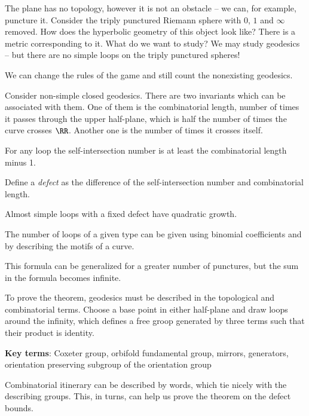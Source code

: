\documentclass[11pt]{scrartcl}
\begin{document}
The plane has no topology, however it is not an obstacle -- we can,
for example, puncture it. Consider the triply punctured Riemann sphere
with $0$, $1$ and $\infty$ removed. How does the hyperbolic geometry
of this object look like? There is a metric corresponding to it. What
do we want to study? We may study geodesics -- but there are no simple
loops on the triply punctured spheres!

We can change the rules of the game and still count the nonexisting
geodesics.

Consider non-simple closed geodesics. There are two invariants which
can be associated with them. One of them is the combinatorial length,
number of times it passes through the upper half-plane, which is half
the number of times the curve crosses $\RR$. Another one is the number
of times it crosses itself.

For any loop the self-intersection number is at least the
combinatorial length minus 1.

Define a \textit{defect} as the difference of the self-intersection
number and combinatorial length.

Almost simple loops with a fixed defect have quadratic growth.

The number of loops of a given type can be given using binomial
coefficients and by describing the motifs of a curve.

This formula can be generalized for a greater number of punctures, but
the sum in the formula becomes infinite.

To prove the theorem, geodesics must be described in the topological
and combinatorial terms. Choose a base point in either half-plane and
draw loops around the infinity, which defines a free groop generated
by three terms such that their product is identity.

\textbf{Key terms}: Coxeter group, orbifold fundamental group, mirrors,
generators, orientation preserving subgroup of the orientation group

Combinatorial itinerary can be described by words, which tie nicely
with the describing groups. This, in turns, can help us prove the
theorem on the defect bounds.
\end{document}
